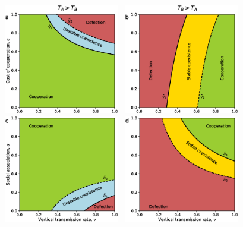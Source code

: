 \documentclass[12pt]{extarticle}
\begin{document}
{%

\begin{figure}[h]
  \centering       
    \includegraphics[width=0.45\textwidth]{Result3_TA_TB.eps}~
    \includegraphics[width=0.45\textwidth]{Result3_TB_TA.eps}
    \includegraphics[width=0.45\textwidth]{Result3_alpha_Vs_v_TA_TB.eps}~
    \includegraphics[width=0.45\textwidth]{Result3_alpha_Vs_v_TB_TA.eps}

\end{figure}}
\end{document}
